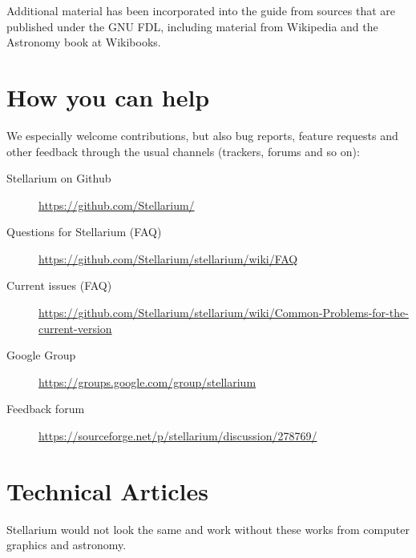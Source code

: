 Additional material has been incorporated into the guide from sources
that are published under the GNU FDL, including material from Wikipedia
and the Astronomy book at Wikibooks.

\section{How you can help}
\label{sec:HowYouCanHelp}

We especially welcome contributions, but also bug reports, feature requests and other feedback through the
usual channels (trackers, forums and so on):
\begin{description}
\item[Stellarium on Github] \url{https://github.com/Stellarium/}
\item[Questions for Stellarium (FAQ)] \url{https://github.com/Stellarium/stellarium/wiki/FAQ}
\item[Current issues (FAQ)] \url{https://github.com/Stellarium/stellarium/wiki/Common-Problems-for-the-current-version}
\item[Google Group] \url{https://groups.google.com/group/stellarium}
\item[Feedback forum] \url{https://sourceforge.net/p/stellarium/discussion/278769/}
\end{description}


\section{Technical Articles}
\label{sec:ack:technical}

Stellarium would not look the same and work without these works from computer graphics and astronomy.

